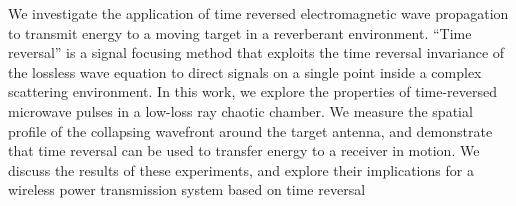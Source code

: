% 
% 
%
We investigate the application of time reversed
electromagnetic wave propagation to transmit energy to a moving
target in a reverberant environment. ``Time reversal'' is a signal
focusing method that exploits the time reversal invariance of the
lossless wave equation to direct signals on a single point inside
a complex scattering environment. In this work, we explore the
properties of time-reversed microwave pulses in a low-loss ray chaotic
chamber. We measure the spatial profile of the collapsing
wavefront around the target antenna, and demonstrate that time
reversal can be used to transfer energy to a receiver in motion.
We discuss the results of these experiments, and explore their
implications for a wireless power transmission system based on
time reversal
